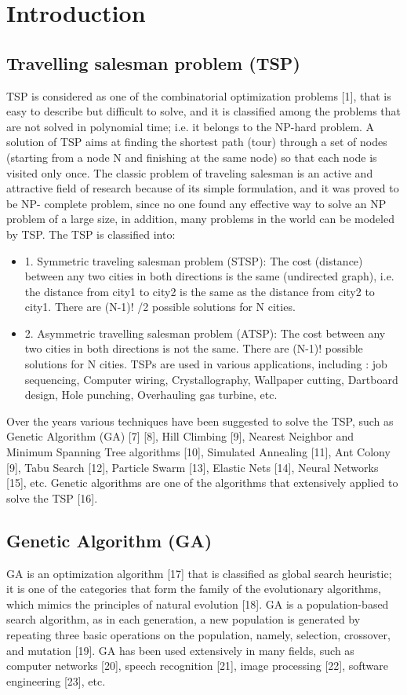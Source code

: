 \documentclass[conference]{IEEEtran}
\begin{document}
\section{Introduction}
\subsection{ Travelling salesman problem (TSP)}
TSP is considered as one of the combinatorial optimization problems [1], that is easy to describe but difficult to solve, and it is classified among the problems that are not solved in polynomial time; i.e. it belongs to the NP-hard problem.
A solution of TSP aims at finding the shortest path (tour) through a set of nodes (starting from a node N and finishing at the same node) so that each node is visited only once.
The classic problem of traveling salesman is an active and attractive field of research because of its simple formulation, and it was proved to be NP- complete problem, since no one found any effective way to solve an NP problem of a large size, in addition, many problems in the world can be modeled by TSP.
The TSP is classified into:
\begin{itemize}
    \item 1. Symmetric traveling salesman problem (STSP):
The cost (distance) between any two cities in both directions is the same (undirected graph), i.e. the distance from city1 to city2 is the same as the distance from city2 to city1. There are (N-1)! /2 possible solutions for N cities.
\item 2. Asymmetric travelling salesman problem (ATSP): The cost between any two cities in both directions is not the same. There are (N-1)! possible solutions for N cities.
TSPs are used in various applications, including : job sequencing, Computer wiring, Crystallography, Wallpaper cutting, Dartboard design, Hole punching, Overhauling gas turbine, etc. 
\end{itemize}


Over the years various techniques have been suggested to solve the TSP, such as Genetic Algorithm (GA) [7] [8], Hill Climbing [9], Nearest Neighbor and Minimum Spanning Tree algorithms [10], Simulated Annealing [11], Ant Colony [9], Tabu Search [12], Particle Swarm [13], Elastic Nets [14], Neural Networks [15], etc. Genetic algorithms are one of the algorithms that extensively applied to solve the TSP [16].

\subsection{Genetic Algorithm (GA)}
GA is an optimization algorithm [17] that is classified as global search heuristic; it is one of the categories that form the family of the evolutionary algorithms, which mimics the principles of natural evolution [18]. GA is a population-based search algorithm, as in each generation, a new population is generated by repeating three basic operations on the population, namely, selection, crossover, and mutation [19]. GA has been used extensively in many fields, such as computer networks [20], speech recognition [21], image processing [22], software engineering [23], etc.
\end{document}
